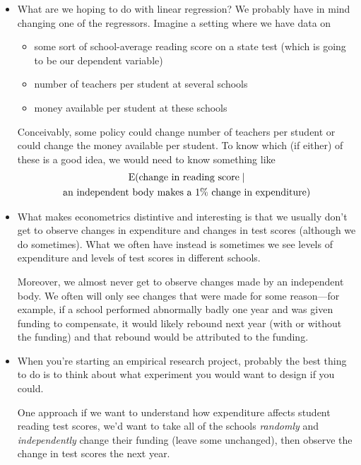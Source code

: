 \begin{itemize}[leftmargin=0pt]

\item What are we hoping to do with linear regression?  We probably
  have in mind changing one of the regressors.  Imagine a setting
  where we have data on
  \begin{itemize}
  \item some sort of school-average reading score on a state test
    (which is going to be our dependent variable)
  \item number of teachers per student at several schools
  \item money available per student at these schools
  \end{itemize}
  Conceivably, some policy could change number of teachers per student
  or could change the money available per student.  To know which (if
  either) of these is a good idea, we would need to know something like
  \begin{multline*}
    \operatorname{E}(\text{change in reading score} \mid \\
       \text{an independent body makes a 1\% change in expenditure})
  \end{multline*}

\item What makes econometrics distintive and interesting is that we
  usually don't get to observe changes in expenditure and changes in
  test scores (although we do sometimes).  What we often have instead
  is sometimes we see levels of expenditure and levels of test scores
  in different schools.

  Moreover, we almost never get to observe changes made by an
  independent body.  We often will only see changes that were made for
  some reason---for example, if a school performed abnormally badly one
  year and was given funding to compensate, it would likely rebound
  next year (with or without the funding) and that rebound would be
  attributed to the funding.

\item When you're starting an empirical research project, probably the
  best thing to do is to think about what experiment you would want to
  design if you could.

  One approach if we want to understand how expenditure affects
  student reading test scores, we'd want to take all of the schools
  \emph{randomly} and \emph{independently} change their funding (leave
  some unchanged), then observe the change in test scores the next
  year.


\end{itemize}
